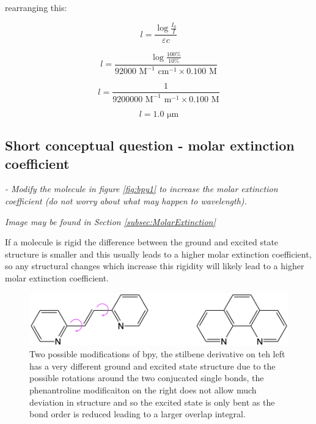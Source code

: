\documentclass[
]{book}
\begin{document}
rearranging this:

\begin{equation*}
l = \frac{\log{\frac{I_0}{I}}}{\varepsilon c}
\end{equation*}

\begin{equation*}
l = \frac{\log{\frac{100 \%}{10 \%}}}{92000 \textrm{ M}^{-1} \textrm{ cm}^{-1} \times 0.100 \textrm{ M}}
\end{equation*}

\begin{equation*}
l = \frac{1}{9200000 \textrm{ M}^{-1} \textrm{ m}^{-1} \times 0.100 \textrm{ M}}
\end{equation*}

\begin{equation*}
l = 1.0 \textrm{ μm}
\end{equation*}

\hypertarget{subsec:MolarExtinctionans}{%
\subsection{Short conceptual question - molar extinction coefficient}\label{subsec:MolarExtinctionans}}

\emph{- Modify the molecule in figure \ref{fig:bpy1} to increase the molar extinction coefficient (do not worry about what may happen to wavelength).}

\emph{Image may be found in Section \ref{subsec:MolarExtinction}}

If a molecule is rigid the difference between the ground and excited state structure is smaller and this usually leads to a higher molar extinction coefficient, so any structural changes which increase this rigidity will likely lead to a higher molar extinction coefficient.

\begin{figure}

{\centering \includegraphics[width=1\linewidth]{images/structurealts} 

}

\caption{Two possible modifications of bpy, the stilbene derivative on teh left has a very different ground and excited state structure due to the possible rotations around the two conjucated single bonds, the phenantroline modificaiton on the right does not allow much deviation in structure and so the excited state is only bent as the bond order is reduced leading to a larger overlap integral.}\label{fig:bpyalts}
\end{figure}
\end{document}
